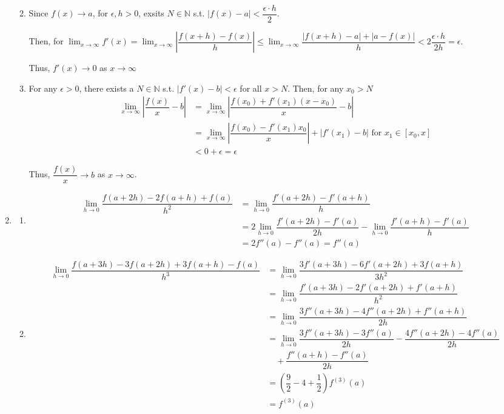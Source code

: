 \documentclass[12pt]{article}
\begin{document}
\begin{enumerate}
\begin{enumerate}
        \newpage
        \item Since $f(x) \to a$, for $\epsilon, h> 0$, exsits $N\in\mathbb{N}$ s.t. $|f(x) - a| < \dfrac{\epsilon \cdot h}{2}$.
        
        Then, for $\displaystyle\lim_{x\to\infty} f'(x) = \displaystyle\lim_{x\to\infty} |\dfrac{f(x + h)-f(x)}{h}| \leq \displaystyle\lim_{x\to\infty} \dfrac{|f(x + h) - a| + |a - f(x)|}{h} < 2\dfrac{\epsilon\cdot h}{2h} = \epsilon$.

        Thus, $f'(x) \to 0$ as $x\to \infty$

        \item For any $\epsilon > 0$, there exists a $N\in\mathbb{N}$ s.t. $|f'(x) - b| < \epsilon$ for all $x > N$.
        Then, for any $x_0 > N$
        \begin{align*}
            \lim_{x\to\infty}|\dfrac{f(x)}{x} - b| &= \lim_{x\to\infty}|\dfrac{f(x_0) + f'(x_1)(x-x_0)}{x} - b|\\
            &=\lim_{x\to\infty} |\dfrac{f(x_0)- f'(x_1)x_0}{x}| + |f'(x_1) - b|\text{ for } x_1\in [x_0, x]\\
            &< 0 + \epsilon = \epsilon
        \end{align*}

        Thus, $\dfrac{f(x)}{x} \to b$ as $x\to\infty$.
    \end{enumerate}

    \item\begin{enumerate}
        \item \begin{align*}
            \lim_{h\to 0} \dfrac{f(a+2h)-2f(a+h)+f(a)}{h^2} &= \lim_{h\to 0} \dfrac{f'(a+2h) - f'(a+h)}{h}\\
            &= 2\lim_{h\to 0} \dfrac{f'(a + 2h) - f'(a)}{2h} - \lim_{h\to 0}\dfrac{f'(a + h) - f'(a)}{h}\\
            &= 2f''(a) - f''(a) = f''(a)
        \end{align*}    

        \item \begin{align*}
            \lim_{h\to 0} \dfrac{f(a + 3h) - 3f(a + 2h) + 3f(a + h) - f(a)}{h^3} &= \lim_{h\to 0} \dfrac{3f'(a+3h) - 6f'(a + 2h) + 3f(a + h)}{3h^2}\\
            &= \lim_{h\to 0} \dfrac{f'(a + 3h) - 2f'(a+2h) + f'(a + h)}{h^2}\\
            &= \lim_{h\to 0} \dfrac{3f''(a + 3h) - 4f''(a + 2h) + f''(a+h)}{2h}\\
            &= \lim_{h\to 0} \dfrac{3f''(a+3h) - 3f''(a)}{2h} - \dfrac{4f''(a+2h) - 4f''(a)}{2h}\\
            &\quad+ \dfrac{f''(a + h) - f''(a)}{2h}\\
            &= (\dfrac{9}{2} - 4 + \dfrac{1}{2}) f^{(3)}(a)\\
            &= f^{(3)}(a)
        \end{align*}

    \end{enumerate}
\end{enumerate}
\end{document}

